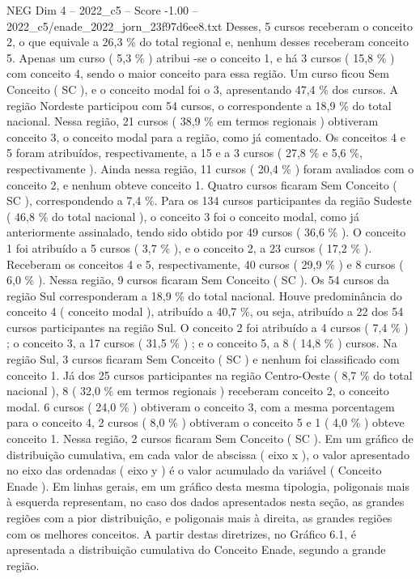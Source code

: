 \begin{textsample}{NEG Dim 4 – 2022\_c5 – Score -1.00 – 2022\_c5/enade\_2022\_jorn\_23f97d6ee8.txt}
Desses, 5 cursos receberam o conceito 2, o que equivale a 26,3 \% do total regional e, nenhum desses receberam conceito 5.
Apenas um curso ( 5,3 \% ) atribui -se o conceito 1, e há 3 cursos ( 15,8 \% ) com conceito 4, sendo o maior conceito para essa região.
Um curso ficou Sem Conceito ( SC ), e o conceito modal foi o 3, apresentando 47,4 \% dos cursos.
A região Nordeste participou com 54 cursos, o correspondente a 18,9 \% do total nacional.
Nessa região, 21 cursos ( 38,9 \% em termos regionais ) obtiveram conceito 3, o conceito modal para a região, como já comentado.
Os conceitos 4 e 5 foram atribuídos, respectivamente, a 15 e a 3 cursos ( 27,8 \% e 5,6 \%, respectivamente ).
Ainda nessa região, 11 cursos ( 20,4 \% ) foram avaliados com o conceito 2, e nenhum obteve conceito 1.
Quatro cursos ficaram Sem Conceito ( SC ), correspondendo a 7,4 \%.
Para os 134 cursos participantes da região Sudeste ( 46,8 \% do total nacional ), o conceito 3 foi o conceito modal, como já anteriormente assinalado, tendo sido obtido por 49 cursos ( 36,6 \% ).
O conceito 1 foi atribuído a 5 cursos ( 3,7 \% ), e o conceito 2, a 23 cursos ( 17,2 \% ).
Receberam os conceitos 4 e 5, respectivamente, 40 cursos ( 29,9 \% ) e 8 cursos ( 6,0 \% ).
Nessa região, 9 cursos ficaram Sem Conceito ( SC ).
Os 54 cursos da região Sul corresponderam a 18,9 \% do total nacional.
Houve predominância do conceito 4 ( conceito modal ), atribuído a 40,7 \%, ou seja, atribuído a 22 dos 54 cursos participantes na região Sul.
O conceito 2 foi atribuído a 4 cursos ( 7,4 \% ) ; o conceito 3, a 17 cursos ( 31,5 \% ) ; e o conceito 5, a 8 ( 14,8 \% ) cursos.
Na região Sul, 3 cursos ficaram Sem Conceito ( SC ) e nenhum foi classificado com conceito 1.
Já dos 25 cursos participantes na região Centro-Oeste ( 8,7 \% do total nacional ), 8 ( 32,0 \% em termos regionais ) receberam conceito 2, o conceito modal. 6 cursos ( 24,0 \% ) obtiveram o conceito 3, com a mesma porcentagem para o conceito 4, 2 cursos ( 8,0 \% ) obtiveram o conceito 5 e 1 ( 4,0 \% ) obteve conceito 1.
Nessa região, 2 cursos ficaram Sem Conceito ( SC ).
Em um gráfico de distribuição cumulativa, em cada valor de abscissa ( eixo x ), o valor apresentado no eixo das ordenadas ( eixo y ) é o valor acumulado da variável ( Conceito Enade ).
Em linhas gerais, em um gráfico desta mesma tipologia, poligonais mais à esquerda representam, no caso dos dados apresentados nesta seção, as grandes regiões com a pior distribuição, e poligonais mais à direita, as grandes regiões com os melhores conceitos.
A partir destas diretrizes, no Gráfico 6.1, é apresentada a distribuição cumulativa do Conceito Enade, segundo a grande região.

\end{textsample}
